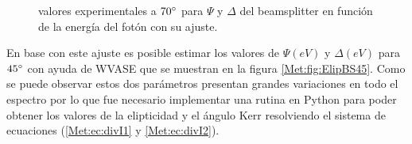 \documentclass[paper=letter, fontsize=12pt]{scrartcl}
\numberwithin{equation}{section}		%
\numberwithin{figure}{section}			%
\numberwithin{table}{section}				%
\begin{document}
\begin{figure}[!hbt]
	\centering
	\caption[Gr\'aficas de $\Psi$ y $\Delta$ del beamspliter a $70 \degree$.]{valores experimentales a $70\degree$  para $\Psi$ y $\Delta$ del beamsplitter en funci\'on de la energ\'ia del fot\'on con su ajuste.} 
	\label{Met:fig:ElipBS}
\end{figure}
\par En base con este ajuste es posible estimar los valores de $\varPsi (eV)$ y $\Delta (eV)$ para $45 \degree$ con ayuda de WVASE que se muestran en la figura \ref{Met:fig:ElipBS45}. Como se puede observar estos dos par\'ametros presentan grandes variaciones en todo el espectro  por lo que fue necesario implementar una rutina en Python  para poder obtener  los valores de la elipticidad  y el \'angulo Kerr resolviendo el sistema de ecuaciones (\ref{Met:ec:divI1} y \ref{Met:ec:divI2}).
\end{document}

